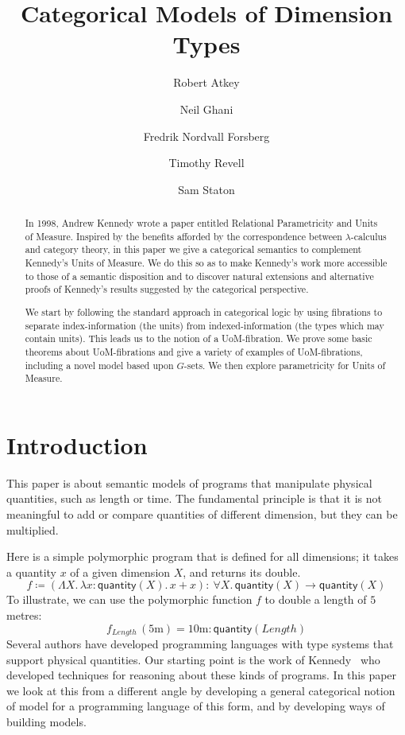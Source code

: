 \documentclass[a4paper,UKenglish]{lipics}
\title{Categorical Models of Dimension Types}
\author[1]{Robert Atkey}
\author[2]{Neil Ghani}
\author[2]{Fredrik Nordvall Forsberg}
\author[2]{Timothy Revell}
\author[3]{Sam Staton}
\affil[1]{University of Edinburgh}
\affil[2]{University of Strathclyde}
\affil[3]{University of Cambridge}
\newcommand{\UoM}{Units of Measure\xspace}
\newcommand{\msf}[1]{\mathsf{#1}} %
\newcommand{\num}{\msf{quantity}}
\newcommand{\length}{\mathit{Length}}
\newcommand{\UoMFibrations}{UoM-fibrations\xspace}
\begin{document}
\maketitle

\begin{abstract}

  In 1998, Andrew Kennedy wrote a paper entitled Relational Parametricity and \UoM\cite{Kennedy:1997:RPU:263699.263761}. Inspired by the benefits afforded by the correspondence between $\lambda$-calculus and category theory, in this paper we give a categorical semantics to complement Kennedy's \UoM. We do this so as to make Kennedy's work more accessible to those of a semantic disposition and to discover natural extensions and alternative proofs of Kennedy's results suggested by the categorical perspective.

  We start by following the standard approach in categorical logic by using fibrations to separate index-information (the units) from indexed-information (the types which may contain units). This leads us to the notion of a UoM-fibration. We prove some basic theorems about UoM-fibrations and give a variety of examples of \UoMFibrations, including a novel model based upon $G$-sets. We then explore parametricity for \UoM.
\end{abstract}

\section{Introduction}
This paper is about semantic models of programs
that manipulate physical quantities, such
as length or time. The fundamental principle is that it is not
meaningful to add or compare quantities of different dimension, but
they can be multiplied.

Here is a simple polymorphic program that is defined for all dimensions;
it takes a quantity $x$ of a given dimension $X$, and returns its double.
\begin{equation}
f\coloneqq (\Lambda X.\,\lambda x:\num(X).\,x+x)
:\ \forall X.\,\num(X)\to \num(X)
\label{eqn:double}
\end{equation}
To illustrate, we can use the polymorphic
function $f$ to double a length of $5$ metres:
\begin{equation}
f_\length\,(5\mathrm{m})=
10\mathrm{m}:\num(\length)
\label{eqn:doubleapp}
\end{equation}
Several authors have developed programming languages with type systems
that support physical quantities. Our starting point is the work of
Kennedy~\cite{Kennedy:1997:RPU:263699.263761} who developed techniques
for reasoning about these kinds of programs. In this paper we look at
this from a different angle by developing a general categorical notion
of model for a programming language of this form, and by developing
ways of building models.
\end{document}
